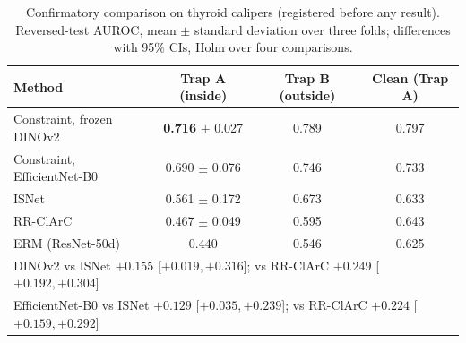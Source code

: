 \documentclass[12pt]{article}
\begin{document}
\begin{table}[t]\centering\small
\caption{Confirmatory comparison on thyroid calipers (registered before any result). Reversed-test AUROC, mean $\pm$
standard deviation over three folds; differences with 95\% CIs, Holm over four comparisons.}\label{tab:phase5}
\begin{tabular}{lccc}\toprule
Method & Trap A (inside) & Trap B (outside) & Clean (Trap A)\\\midrule
Constraint, frozen DINOv2 & \textbf{0.716} $\pm$ 0.027 & 0.789 & 0.797\\
Constraint, EfficientNet-B0 & 0.690 $\pm$ 0.076 & 0.746 & 0.733\\
ISNet \cite{bassi2024isnet} & 0.561 $\pm$ 0.172 & 0.673 & 0.633\\
RR-ClArC \cite{pahde2025ensuring} & 0.467 $\pm$ 0.049 & 0.595 & 0.643\\
ERM (ResNet-50d) & 0.440 & 0.546 & 0.625\\\midrule
\multicolumn{4}{l}{DINOv2 vs ISNet $+0.155$ [$+0.019, +0.316$]; vs RR-ClArC $+0.249$ [$+0.192, +0.304$]}\\
\multicolumn{4}{l}{EfficientNet-B0 vs ISNet $+0.129$ [$+0.035, +0.239$]; vs RR-ClArC $+0.224$ [$+0.159, +0.292$]}\\
\bottomrule\end{tabular}\end{table}
\end{document}
